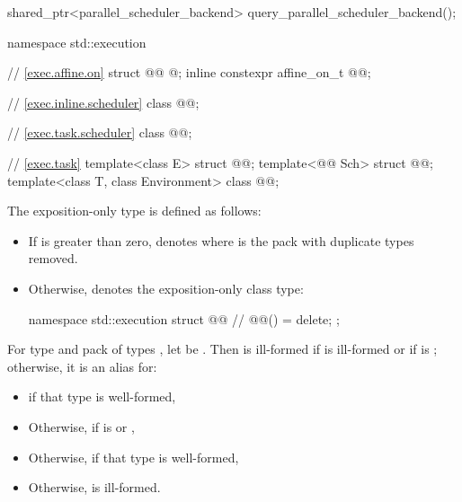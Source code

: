 \begin{codeblock}
{  shared_ptr<parallel_scheduler_backend> query_parallel_scheduler_backend();
}

namespace std::execution {
  // \ref{exec.affine.on}
  struct @@ { @\unspec@ };
  inline constexpr affine_on_t @@{};

  // \ref{exec.inline.scheduler}
  class @@;

  // \ref{exec.task.scheduler}
  class @@;

  // \ref{exec.task}
  template<class E>
    struct @@;
  template<@@ Sch>
    struct @@;
  template<class T, class Environment>
    class @@;
}
\end{codeblock}

\pnum
The exposition-only type 
is defined as follows:
\begin{itemize}
\item
If  is greater than zero,
 denotes 
where  is the pack 
with duplicate types removed.
\item
Otherwise,  denotes
the exposition-only class type:
\begin{codeblock}
namespace std::execution {
  struct @@ {        // \expos
    @@() = delete;
  };
}
\end{codeblock}
\end{itemize}

\pnum
For type  and pack of types ,
let  be .
Then  is ill-formed
if  is ill-formed or
if  is ;
otherwise, it is an alias for:
\begin{itemize}
\item
{}
if that type is well-formed,
\item
Otherwise, 
if  is
 or ,
\item
Otherwise, 
if that\linebreak{} type is well-formed,
\item
Otherwise,  is ill-formed.
\end{itemize}

